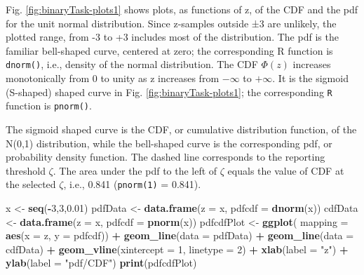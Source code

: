 \documentclass[
]{book}
\newenvironment{Shaded}{\begin{snugshade}}{\end{snugshade}}
\newcommand{\DataTypeTok}[1]{\textcolor[rgb]{0.13,0.29,0.53}{#1}}
\newcommand{\DecValTok}[1]{\textcolor[rgb]{0.00,0.00,0.81}{#1}}
\newcommand{\FloatTok}[1]{\textcolor[rgb]{0.00,0.00,0.81}{#1}}
\newcommand{\KeywordTok}[1]{\textcolor[rgb]{0.13,0.29,0.53}{\textbf{#1}}}
\newcommand{\NormalTok}[1]{#1}
\newcommand{\OperatorTok}[1]{\textcolor[rgb]{0.81,0.36,0.00}{\textbf{#1}}}
\newcommand{\StringTok}[1]{\textcolor[rgb]{0.31,0.60,0.02}{#1}}
\begin{document}
Fig. \ref{fig:binaryTask-plots1} shows plots, as functions of z, of the CDF and the pdf for the unit normal distribution. Since z-samples outside ±3 are unlikely, the plotted range, from -3 to +3 includes most of the distribution. The pdf is the familiar bell-shaped curve, centered at zero; the corresponding R function is \texttt{dnorm()}, i.e., density of the normal distribution. The CDF \(\Phi(z)\) increases monotonically from 0 to unity as z increases from \(-\infty\) to \(+\infty\). It is the sigmoid (S-shaped) shaped curve in Fig. \ref{fig:binaryTask-plots1}; the corresponding \texttt{R} function is \texttt{pnorm()}.

The sigmoid shaped curve is the CDF, or cumulative distribution function, of the N(0,1) distribution, while the bell-shaped curve is the corresponding pdf, or probability density function. The dashed line corresponds to the reporting threshold \(\zeta\). The area under the pdf to the left of \(\zeta\) equals the value of CDF at the selected \(\zeta\), i.e., 0.841 (\texttt{pnorm(1)} = 0.841).

\begin{Shaded}
\begin{Highlighting}[]
\NormalTok{x \textless{}{-}}\StringTok{ }\KeywordTok{seq}\NormalTok{(}\OperatorTok{{-}}\DecValTok{3}\NormalTok{,}\DecValTok{3}\NormalTok{,}\FloatTok{0.01}\NormalTok{)}
\NormalTok{pdfData \textless{}{-}}\StringTok{ }\KeywordTok{data.frame}\NormalTok{(}\DataTypeTok{z =}\NormalTok{ x, }\DataTypeTok{pdfcdf =} \KeywordTok{dnorm}\NormalTok{(x))}
\NormalTok{cdfData \textless{}{-}}\StringTok{ }\KeywordTok{data.frame}\NormalTok{(}\DataTypeTok{z =}\NormalTok{ x, }\DataTypeTok{pdfcdf =} \KeywordTok{pnorm}\NormalTok{(x))}
\NormalTok{pdfcdfPlot \textless{}{-}}\StringTok{ }\KeywordTok{ggplot}\NormalTok{(}
  \DataTypeTok{mapping =} \KeywordTok{aes}\NormalTok{(}\DataTypeTok{x =}\NormalTok{ z, }\DataTypeTok{y =}\NormalTok{ pdfcdf)) }\OperatorTok{+}\StringTok{ }
\StringTok{  }\KeywordTok{geom\_line}\NormalTok{(}\DataTypeTok{data =}\NormalTok{ pdfData) }\OperatorTok{+}\StringTok{ }
\StringTok{  }\KeywordTok{geom\_line}\NormalTok{(}\DataTypeTok{data =}\NormalTok{ cdfData) }\OperatorTok{+}
\StringTok{  }\KeywordTok{geom\_vline}\NormalTok{(}\DataTypeTok{xintercept =} \DecValTok{1}\NormalTok{, }\DataTypeTok{linetype =} \DecValTok{2}\NormalTok{) }\OperatorTok{+}\StringTok{ }
\StringTok{  }\KeywordTok{xlab}\NormalTok{(}\DataTypeTok{label =} \StringTok{"z"}\NormalTok{) }\OperatorTok{+}\StringTok{ }\KeywordTok{ylab}\NormalTok{(}\DataTypeTok{label =} \StringTok{"pdf/CDF"}\NormalTok{)}
\KeywordTok{print}\NormalTok{(pdfcdfPlot)}
\end{Highlighting}
\end{Shaded}
\end{document}
